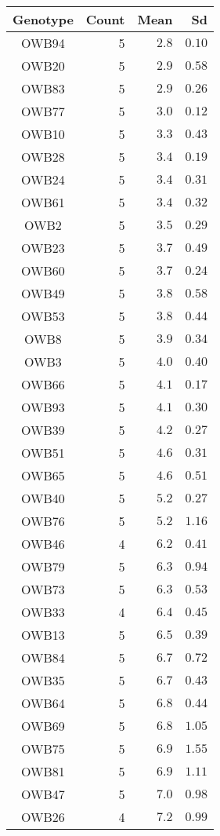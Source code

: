 \begin{longtable}{crrr}
\toprule
Genotype & Count & Mean & Sd \\ 
\midrule\addlinespace[2.5pt]
OWB94 & 5 & $2.8$ & $0.10$ \\ 
OWB20 & 5 & $2.9$ & $0.58$ \\ 
OWB83 & 5 & $2.9$ & $0.26$ \\ 
OWB77 & 5 & $3.0$ & $0.12$ \\ 
OWB10 & 5 & $3.3$ & $0.43$ \\ 
OWB28 & 5 & $3.4$ & $0.19$ \\ 
OWB24 & 5 & $3.4$ & $0.31$ \\ 
OWB61 & 5 & $3.4$ & $0.32$ \\ 
OWB2 & 5 & $3.5$ & $0.29$ \\ 
OWB23 & 5 & $3.7$ & $0.49$ \\ 
OWB60 & 5 & $3.7$ & $0.24$ \\ 
OWB49 & 5 & $3.8$ & $0.58$ \\ 
OWB53 & 5 & $3.8$ & $0.44$ \\ 
OWB8 & 5 & $3.9$ & $0.34$ \\ 
OWB3 & 5 & $4.0$ & $0.40$ \\ 
OWB66 & 5 & $4.1$ & $0.17$ \\ 
OWB93 & 5 & $4.1$ & $0.30$ \\ 
OWB39 & 5 & $4.2$ & $0.27$ \\ 
OWB51 & 5 & $4.6$ & $0.31$ \\ 
OWB65 & 5 & $4.6$ & $0.51$ \\ 
OWB40 & 5 & $5.2$ & $0.27$ \\ 
OWB76 & 5 & $5.2$ & $1.16$ \\ 
OWB46 & 4 & $6.2$ & $0.41$ \\ 
OWB79 & 5 & $6.3$ & $0.94$ \\ 
OWB73 & 5 & $6.3$ & $0.53$ \\ 
OWB33 & 4 & $6.4$ & $0.45$ \\ 
OWB13 & 5 & $6.5$ & $0.39$ \\ 
OWB84 & 5 & $6.7$ & $0.72$ \\ 
OWB35 & 5 & $6.7$ & $0.43$ \\ 
OWB64 & 5 & $6.8$ & $0.44$ \\ 
OWB69 & 5 & $6.8$ & $1.05$ \\ 
OWB75 & 5 & $6.9$ & $1.55$ \\ 
OWB81 & 5 & $6.9$ & $1.11$ \\ 
OWB47 & 5 & $7.0$ & $0.98$ \\ 
OWB26 & 4 & $7.2$ & $0.99$ \\ 

\end{longtable}
